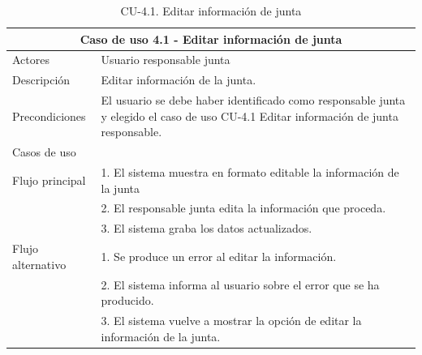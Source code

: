 \begin{table}[H]
    \caption{CU-4.1. Editar información de junta}
    \label{tab:CU-4.1}
    \begin{center}
        \begin{tabular}{|l|p{12cm}|}
            \hline
            \multicolumn{2}{|c|}{Caso de uso 4.1 - Editar información de junta} \\ \hline \hline
            Actores                 &   Usuario responsable junta          \\  \hline
            Descripción             &   Editar información  de la junta. \\  \hline
            Precondiciones          &   El usuario se debe haber identificado como responsable junta y elegido el caso de uso CU-4.1 Editar información de junta responsable. \\
            \hline
            Casos de uso            &             \\  \hline
            Flujo principal         &   1. El sistema muestra en formato editable la información de la junta   \\
            &   2. El responsable junta edita la información que proceda.    \\ 
            & 3. El sistema graba los datos actualizados. \\ 
            \hline
            Flujo alternativo    &   1. Se produce un error al editar la información. \\
            & 2. El sistema informa al usuario sobre el error que se ha producido. \\
            & 3. El sistema vuelve a mostrar la opción de editar la información de la junta. \\ 
            \hline
        \end{tabular}
    \end{center}
\end{table}

